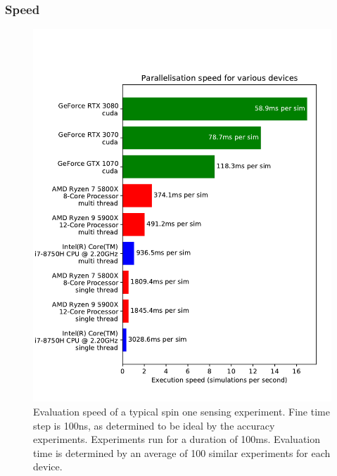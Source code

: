 \documentclass{jors}
\begin{document}
		\subsubsection*{Speed}
			\begin{figure}[htbp!]
				\centering
				\includegraphics[scale=0.7]{benchmark_device_aggregate.pdf}
				\caption{Evaluation speed of a typical spin one sensing experiment. Fine time step is 100ns, as determined to be ideal by the accuracy experiments. Experiments run for a duration of 100ms. Evaluation time is determined by an average of 100 similar experiments for each device.}
				\label{fig:benchmark_device_aggregate}
			\end{figure}
\end{document}
